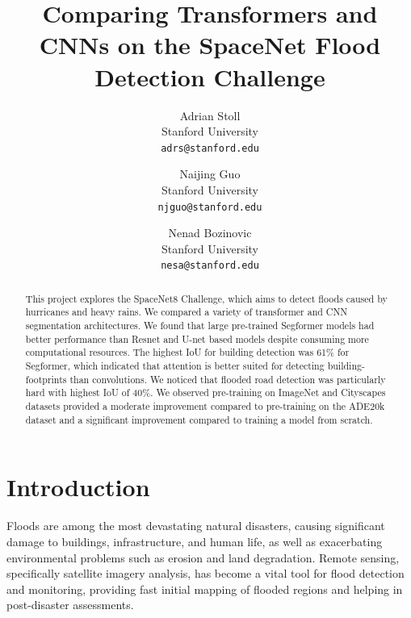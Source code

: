 \documentclass[10pt,twocolumn,letterpaper]{article}
\begin{document}

\title{Comparing Transformers and CNNs on the SpaceNet Flood Detection Challenge}

\author{Adrian Stoll\\
Stanford University\\
{\tt\small adrs@stanford.edu}
\and
Naijing Guo\\
Stanford University\\
{\tt\small njguo@stanford.edu}
\and
Nenad Bozinovic\\
Stanford University\\
{\tt\small nesa@stanford.edu}
}
\maketitle

\begin{abstract}

This project explores the SpaceNet8 Challenge, which aims to detect floods caused by hurricanes and heavy rains. We compared a variety of transformer and CNN segmentation architectures. We found that large pre-trained Segformer models had better performance than Resnet and U-net based models despite consuming more computational resources. The highest IoU for building detection was 61\% for Segformer, which indicated that attention is better suited for detecting building-footprints than convolutions. We noticed that flooded road detection was particularly hard with highest IoU of 40\%. We observed pre-training on ImageNet and Cityscapes datasets provided a moderate improvement compared to pre-training on the ADE20k dataset and a significant improvement compared to training a model from scratch.

\end{abstract}

\section{Introduction}
\label{sec:intro}

Floods are among the most devastating natural disasters, causing significant damage to buildings, infrastructure, and human life, as well as exacerbating environmental problems such as erosion and land degradation. Remote sensing, specifically satellite imagery analysis, has become a vital tool for flood detection and monitoring, providing fast initial mapping of flooded regions and helping in post-disaster assessments. 
\end{document}
